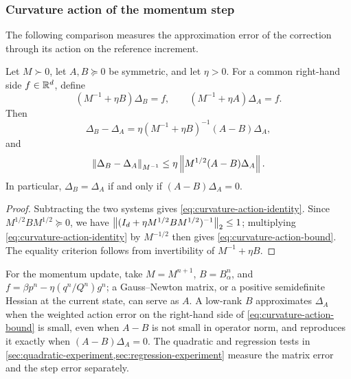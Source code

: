 

\subsubsection{Curvature action of the momentum step}
\label{sec:curvature-action}

The following comparison measures the approximation error of the correction
through its action on the reference increment.

\begin{proposition}
\label{prop:curvature-action}
Let \(M\succ0\), let \(A,B\succeq0\) be symmetric, and let \(\eta>0\).
For a common right-hand side \(f\in\mathbb{R}^d\), define
\begin{equation}
  (M^{-1}+\eta B)\Delta_B=f,
  \qquad
  (M^{-1}+\eta A)\Delta_A=f.
  \label{eq:curvature-reference-steps}
\end{equation}
Then
\begin{equation}
  \Delta_B-\Delta_A
  =\eta(M^{-1}+\eta B)^{-1}(A-B)\Delta_A,
  \label{eq:curvature-action-identity}
\end{equation}
and
\begin{equation}
  \left\lVert\Delta_B-\Delta_A\right\rVert_{M^{-1}}
  \leq\eta\left\lVert M^{1/2}(A-B)\Delta_A\right\rVert.
  \label{eq:curvature-action-bound}
\end{equation}
In particular, \(\Delta_B=\Delta_A\) if and only if
\((A-B)\Delta_A=0\).
\end{proposition}

\begin{proof}
Subtracting the two systems gives \cref{eq:curvature-action-identity}.
Since \(M^{1/2}BM^{1/2}\succeq0\), we have
\(\left\lVert(I_d+\eta M^{1/2}BM^{1/2})^{-1}\right\rVert_2\leq1\); multiplying
\cref{eq:curvature-action-identity} by \(M^{-1/2}\) then gives
\cref{eq:curvature-action-bound}. The equality criterion follows from
invertibility of \(M^{-1}+\eta B\).
\end{proof}

\begin{remark}
\label{rem:curvature-action}
For the momentum update, take \(M=M^{n+1}\), \(B=B_\alpha^n\), and
\(f=\beta p^n-\eta(q^n/Q^n)g^n\); a Gauss--Newton matrix, or a positive
semidefinite Hessian at the current state, can serve as \(A\). A low-rank \(B\)
approximates \(\Delta_A\) when the weighted action error on the right-hand
side of \cref{eq:curvature-action-bound} is small, even when \(A-B\) is not
small in operator norm, and reproduces it exactly when
\((A-B)\Delta_A=0\). The quadratic and regression tests
in \cref{sec:quadratic-experiment,sec:regression-experiment} measure the
matrix error and the step error separately.
\end{remark}

